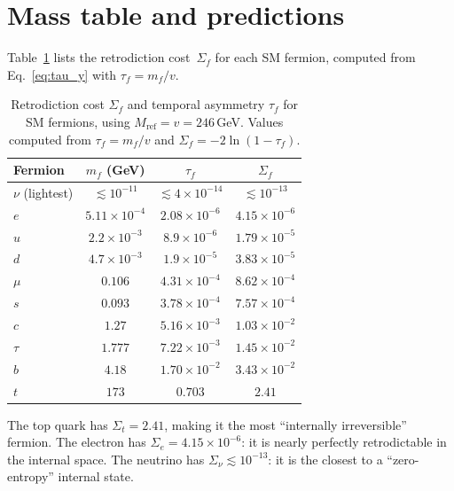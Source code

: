 \documentclass[prl,twocolumn,superscriptaddress,longbibliography]{revtex4-2}
\newcommand{\Mref}{M_{\mathrm{ref}}}
\begin{document}
\section{Mass table and predictions}
\label{sec:predictions}

Table~\ref{tab:masses} lists the retrodiction
cost~$\Sigma_f$ for each SM fermion, computed from
Eq.~\eqref{eq:tau_y} with $\tau_f = m_f/v$.

\begin{table}[t]
\centering
\caption{Retrodiction cost $\Sigma_f$ and temporal
  asymmetry $\tau_f$ for SM fermions, using
  $\Mref = v = 246$\,GeV.
  Values computed from $\tau_f = m_f/v$ and
  $\Sigma_f = -2\ln(1 - \tau_f)$.}
\label{tab:masses}
\begin{ruledtabular}
\begin{tabular}{lccc}
Fermion & $m_f$ (GeV) & $\tau_f$ & $\Sigma_f$ \\
\hline
$\nu$ (lightest) & $\lesssim 10^{-11}$ & $\lesssim 4\times 10^{-14}$ & $\lesssim 10^{-13}$ \\
$e$   & $5.11\times10^{-4}$ & $2.08\times10^{-6}$ & $4.15\times10^{-6}$ \\
$u$   & $2.2\times10^{-3}$  & $8.9\times10^{-6}$  & $1.79\times10^{-5}$ \\
$d$   & $4.7\times10^{-3}$  & $1.9\times10^{-5}$  & $3.83\times10^{-5}$ \\
$\mu$ & $0.106$             & $4.31\times10^{-4}$  & $8.62\times10^{-4}$ \\
$s$   & $0.093$             & $3.78\times10^{-4}$  & $7.57\times10^{-4}$ \\
$c$   & $1.27$              & $5.16\times10^{-3}$  & $1.03\times10^{-2}$ \\
$\tau$& $1.777$             & $7.22\times10^{-3}$  & $1.45\times10^{-2}$ \\
$b$   & $4.18$              & $1.70\times10^{-2}$  & $3.43\times10^{-2}$ \\
$t$   & $173$               & $0.703$              & $2.41$ \\
\end{tabular}
\end{ruledtabular}
\end{table}

\noindent The top quark has $\Sigma_t = 2.41$, making it
the most ``internally irreversible'' fermion.
The electron has $\Sigma_e = 4.15 \times 10^{-6}$: it
is nearly perfectly retrodictable in the internal space.
The neutrino has $\Sigma_\nu \lesssim 10^{-13}$: it
is the closest to a ``zero-entropy'' internal state.
\end{document}
